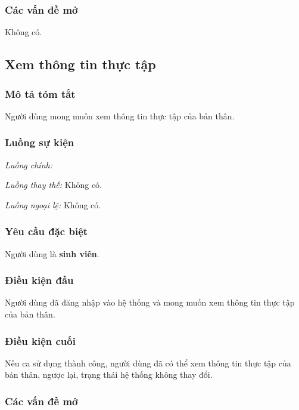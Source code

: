 \documentclass[./../main.tex]{subfiles}
\begin{document}
\subsubsection*{Các vấn đề mở}

Không có.

\subsection{Xem thông tin thực tập}

\subsubsection*{Mô tả tóm tắt}

Người dùng mong muốn xem thông tin thực tập của bản thân.

\subsubsection*{Luồng sự kiện}

\emph{Luồng chính:}

\emph{Luồng thay thế:} Không có.

\emph{Luồng ngoại lệ:} Không có.

\subsubsection*{Yêu cầu đặc biệt}

Người dùng là \textbf{sinh viên}.

\subsubsection*{Điều kiện đầu}

Người dùng đã đăng nhập vào hệ thống và mong muốn xem thông tin thực tập
của bản thân.

\subsubsection*{Điều kiện cuối}

Nếu ca sử dụng thành công, người dùng đã có thể xem thông tin thực tập
của bản thân, ngược lại, trạng thái hệ thống không thay đổi.

\subsubsection*{Các vấn đề mở}
\end{document}
